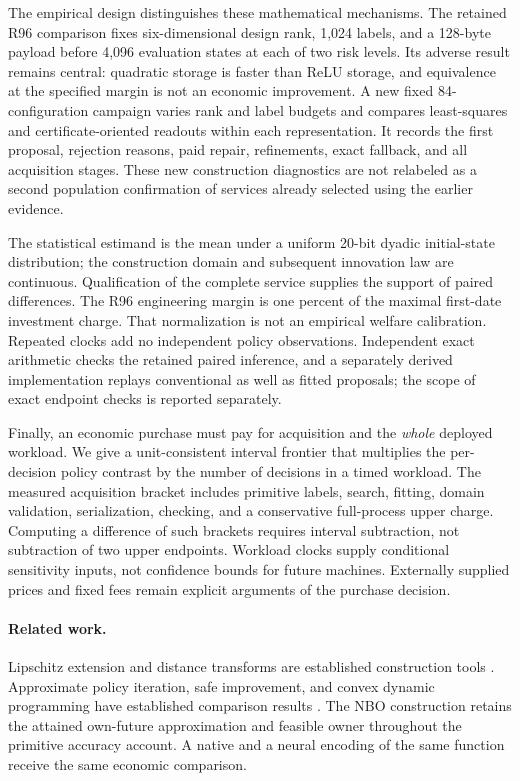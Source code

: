 The empirical design distinguishes these mathematical mechanisms. The retained R96 comparison fixes six-dimensional design rank, 1,024 labels, and a 128-byte payload before 4,096 evaluation states at each of two risk levels. Its adverse result remains central: quadratic storage is faster than ReLU storage, and equivalence at the specified margin is not an economic improvement. A new fixed 84-configuration campaign varies rank and label budgets and compares least-squares and certificate-oriented readouts within each representation. It records the first proposal, rejection reasons, paid repair, refinements, exact fallback, and all acquisition stages. These new construction diagnostics are not relabeled as a second population confirmation of services already selected using the earlier evidence.

The statistical estimand is the mean under a uniform 20-bit dyadic initial-state distribution; the construction domain and subsequent innovation law are continuous. Qualification of the complete service supplies the support of paired differences. The R96 engineering margin is one percent of the maximal first-date investment charge. That normalization is not an empirical welfare calibration. Repeated clocks add no independent policy observations. Independent exact arithmetic checks the retained paired inference, and a separately derived implementation replays conventional as well as fitted proposals; the scope of exact endpoint checks is reported separately.

Finally, an economic purchase must pay for acquisition and the \emph{whole} deployed workload. We give a unit-consistent interval frontier that multiplies the per-decision policy contrast by the number of decisions in a timed workload. The measured acquisition bracket includes primitive labels, search, fitting, domain validation, serialization, checking, and a conservative full-process upper charge. Computing a difference of such brackets requires interval subtraction, not subtraction of two upper endpoints. Workload clocks supply conditional sensitivity inputs, not confidence bounds for future machines. Externally supplied prices and fixed fees remain explicit arguments of the purchase decision.

\paragraph{Related work.}
Lipschitz extension and distance transforms are established construction tools \citep{mcshane1934,felzenszwalb2012}. Approximate policy iteration, safe improvement, and convex dynamic programming have established comparison results \citep{munos2003,pirotta2013,scherrer2015,yang2020convex}. The NBO construction retains the attained own-future approximation and feasible owner throughout the primitive accuracy account. A native and a neural encoding of the same function receive the same economic comparison.

